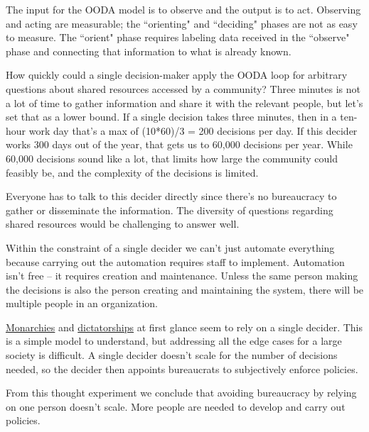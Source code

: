 The input for the OODA model is to observe and the output is to act. Observing and acting are measurable; the ``orienting" and ``deciding" phases are not as easy to measure. The ``orient" phase requires labeling data received in the ``observe" phase and connecting that information to what is already known.

How quickly could a single decision-maker apply the OODA loop for arbitrary questions about \glspl{shared resource} accessed by a community? Three minutes is not a lot of time to gather information and share it with the relevant people, but let's set that as a lower bound.
If a single decision takes three minutes, then in a ten-hour work day that's a max of (10*60)/3 = 200 decisions per day. If this decider works 300 days out of the year, that gets us to 60,000 decisions per year. While 60,000 decisions sound like a lot, that limits how large the community could feasibly be, and the complexity of the decisions is limited. 

Everyone has to talk to this decider directly since there's no bureaucracy to gather or disseminate the information. The diversity of questions regarding shared resources would be challenging to answer well.

Within the constraint of a single decider we can't just automate everything because carrying out the automation requires staff to implement. 
Automation isn't free -- it requires creation and maintenance. Unless the same person making the decisions is also the person creating and maintaining the system, there will be multiple people in an organization.


\href{https://en.wikipedia.org/wiki/Monarchy}{Monarchies} 
and 
\href{https://en.wikipedia.org/wiki/Dictator}{dictatorships}
at first glance seem to rely on a single decider. This is a simple model to understand, but addressing all the edge cases for a large society is difficult. A single decider doesn't scale for the number of decisions needed, so the decider then appoints bureaucrats to subjectively enforce policies. 

From this thought experiment we conclude that avoiding bureaucracy by relying on one person doesn't scale. More people are needed to develop and carry out policies. 




